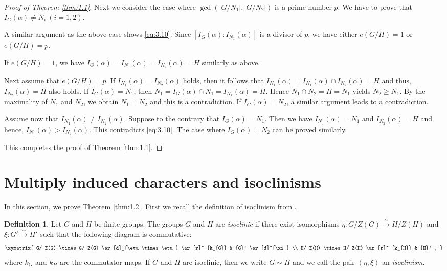 \documentclass[a4paper,12pt]{article}
\theoremstyle{definition}
\newtheorem{definition}[theorem]{Definition}
\theoremstyle{remark}
\numberwithin{equation}{section}
\begin{document}
\begin{proof}[Proof of Theorem \ref{thm:1.1}]
Next we consider the case where $\gcd ( |G/N_1| , |G/N_2|)$ is a prime number $p$.
We have to prove that $I_G (\alpha ) \neq N_i \ (i=1,2)$.

A similar argument as the above case shows \eqref{eq:3.10}.
Since $[I_G (\alpha): I_{N_1} (\alpha) ]$ is a divisor of $p$, we have either $e(G/H)=1$ or $e(G/H)=p$.

If $e(G/H)=1$, we have $I_G (\alpha ) = I_{N_1} (\alpha) = I_{N_2} (\alpha ) =H$ similarly as above.

Next assume that $e(G/H)=p$.
If $I_{N_1} (\alpha)= I_{N_2} (\alpha) $ holds, then it follows that $I_{N_1} (\alpha ) = 
I_{N_1} (\alpha) \cap  I_{N_2} (\alpha) = H $ and thus, $I_{N_2} (\alpha ) = H$ also holds.
If $I_G (\alpha ) = N_1$, then $N_1= I_G (\alpha ) \cap N_1 = I_{N_1} (\alpha ) = H$. Hence
$N_1 \cap N_2 = H = N_1$ yields $N_2 \ge N_1$. By the maximality of $N_1$ and $N_2$, we obtain $N_1 = N_2$
and this is a contradiction. If $I_G (\alpha ) =N_2$, a similar argument leads to a contradiction.

Assume now that $I_{N_1} (\alpha) \ne  I_{N_2} (\alpha)$.
Suppose to the contrary that $I_{G} (\alpha ) =N_1$. Then we have $I_{N_1} (\alpha ) = N_1$ and $I_{N_2} (\alpha ) = H$ and hence,
$I_{N_1} (\alpha )> I_{N_2} (\alpha ) $. This contradicts \eqref{eq:3.10}.
The case where $I_{G} (\alpha ) =N_2$ can be proved similarly.

This completes the proof of Theorem \ref{thm:1.1}.
\end{proof}


\section{Multiply induced characters and isoclinisms} \label{sec:4}
In this section, we prove Theorem \ref{thm:1.2}.
First we recall the definition of isoclinism from \cite{MR0003389}.

\begin{definition} \label{def:4.1}
  Let $G$ and $H$ be finite groups. 
  The groups $G$ and $H$ are \textit{isoclinic} if there exist isomorphisms
  $\eta : G /Z(G) \xrightarrow{\sim} H /Z (H) $
  and $ \xi : {G}' \xrightarrow{\sim} {H}'$ such
  that the following diagram is commutative:
\[
   \xymatrix{
  G/ Z(G) \times G/ Z(G) \ar[d]_{\eta \times \eta}
  \ar[r]^-{k_{G}} & {G}' \ar[d]^{\xi} \\
    H/ Z(H) \times H/ Z(H) \ar[r]^-{k_{H}} & {H}' ,
   }
\]
 where $k_{G} $ and $k_{H}$ are the commutator maps.
 If $G$ and $H$ are isoclinic, then we write $G \sim H$
 and we call the pair $(\eta, \xi)$ an
  \textit{isoclinism}.
\end{definition}
\end{document}
